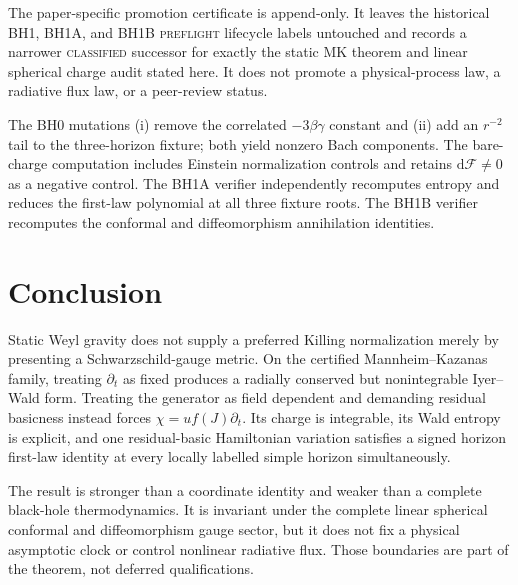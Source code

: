 \documentclass[11pt]{article}
\theoremstyle{definition}
\theoremstyle{remark}
\newcommand{\dd}{\mathrm d}
\begin{document}
The paper-specific promotion certificate is append-only.  It leaves the
historical BH1, BH1A, and BH1B \textsc{preflight} lifecycle labels untouched
and records a narrower \textsc{classified} successor for exactly the static
MK theorem and linear spherical charge audit stated here.  It does not
promote a physical-process law, a radiative flux law, or a peer-review
status.

The BH0 mutations (i) remove the correlated \(-3\beta\gamma\) constant and
(ii) add an \(r^{-2}\) tail to the three-horizon fixture; both yield nonzero
Bach components.  The bare-charge computation includes Einstein
normalization controls and retains \(\dd\mathcal F\neq0\) as a negative
control.  The BH1A verifier independently recomputes entropy and reduces the
first-law polynomial at all three fixture roots.  The BH1B verifier
recomputes the conformal and diffeomorphism annihilation identities.

\section{Conclusion}

Static Weyl gravity does not supply a preferred Killing normalization merely
by presenting a Schwarzschild-gauge metric.  On the certified
Mannheim--Kazanas family, treating \(\partial_t\) as fixed produces a
radially conserved but nonintegrable Iyer--Wald form.  Treating the generator
as field dependent and demanding residual basicness instead forces
\(\chi=u f(J)\partial_t\).  Its charge is integrable, its Wald entropy is
explicit, and one residual-basic Hamiltonian variation satisfies a signed
horizon first-law identity at every locally labelled simple horizon
simultaneously.

The result is stronger than a coordinate identity and weaker than a complete
black-hole thermodynamics.  It is invariant under the complete linear
spherical conformal and diffeomorphism gauge sector, but it does not fix a
physical asymptotic clock or control nonlinear radiative flux.  Those
boundaries are part of the theorem, not deferred qualifications.
\end{document}
